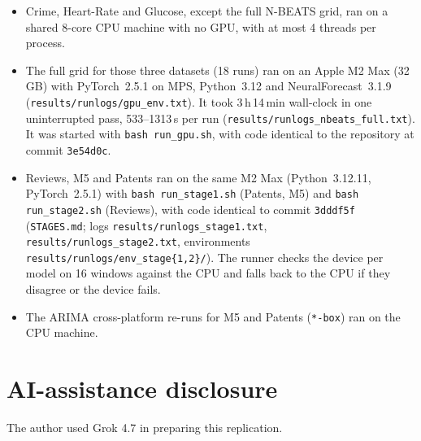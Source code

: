 \begin{itemize}
\item Crime, Heart-Rate and Glucose, except the full N-BEATS grid, ran on a shared 8-core CPU machine with no GPU,
with at most 4 threads per process.
\item The full grid for those three datasets (18 runs) ran on an Apple M2 Max (32\,GB) with PyTorch~2.5.1 on MPS,
Python~3.12 and NeuralForecast~3.1.9 (\texttt{results/runlogs/gpu\_env.txt}). It took 3\,h\,14\,min wall-clock in
one uninterrupted pass, 533--1313\,s per run (\texttt{results/runlogs\_nbeats\_full.txt}). It was started with
\texttt{bash run\_gpu.sh}, with code identical to the repository at commit \texttt{3e54d0c}.
\item Reviews, M5 and Patents ran on the same M2 Max (Python~3.12.11, PyTorch~2.5.1) with
\texttt{bash run\_stage1.sh} (Patents, M5) and \texttt{bash run\_stage2.sh} (Reviews), with code identical to
commit \texttt{3dddf5f} (\texttt{STAGES.md}; logs \texttt{results/runlogs\_stage1.txt},
\texttt{results/runlogs\_stage2.txt}, environments \texttt{results/runlogs/env\_stage\{1,2\}/}). The runner checks
the device per model on 16 windows against the CPU and falls back to the CPU if they disagree or the device fails.
\item The ARIMA cross-platform re-runs for M5 and Patents (\texttt{*-box}) ran on the CPU machine.
\end{itemize}

\section*{AI-assistance disclosure}
The author used Grok 4.7 in preparing this replication.
